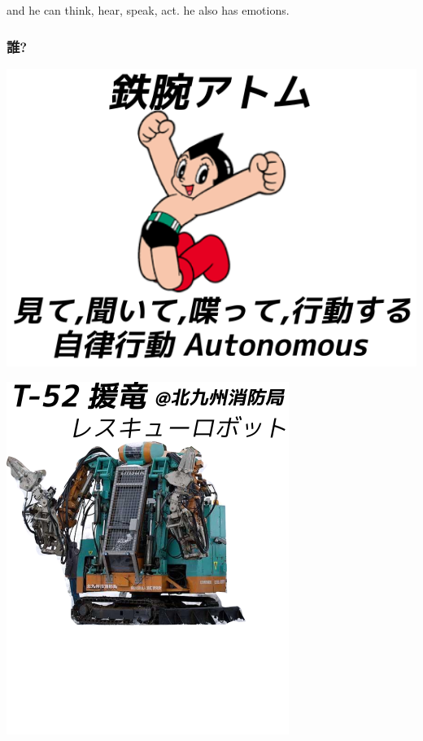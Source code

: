 \begin{resume}
and he can think, hear, speak, act. he also has emotions.
\end{resume}

\subsubsection{誰?}
\label{sec-1-1-3}

\begin{container-fluid}
\begin{row-fluid}
\begin{span6}
\includegraphics{img/astro/final.png}
\end{span6}
\begin{span6}
\includegraphics{img/rescue/2.png}
\end{span6}
\end{row-fluid}
\end{container-fluid}

